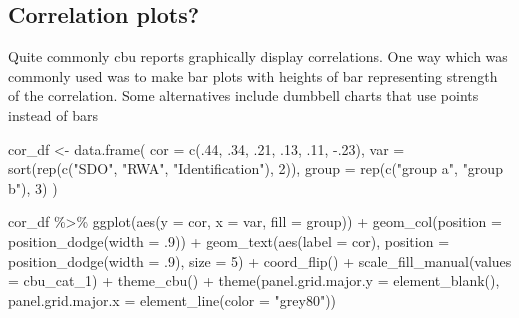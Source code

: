 \documentclass[
  letterpaper,
  DIV=11,
  numbers=noendperiod]{scrreprt}
\newenvironment{Shaded}{\begin{snugshade}}{\end{snugshade}}
\newcommand{\AttributeTok}[1]{\textcolor[rgb]{0.40,0.45,0.13}{#1}}
\newcommand{\DecValTok}[1]{\textcolor[rgb]{0.68,0.00,0.00}{#1}}
\newcommand{\FunctionTok}[1]{\textcolor[rgb]{0.28,0.35,0.67}{#1}}
\newcommand{\NormalTok}[1]{\textcolor[rgb]{0.00,0.23,0.31}{#1}}
\newcommand{\OtherTok}[1]{\textcolor[rgb]{0.00,0.23,0.31}{#1}}
\newcommand{\SpecialCharTok}[1]{\textcolor[rgb]{0.37,0.37,0.37}{#1}}
\newcommand{\StringTok}[1]{\textcolor[rgb]{0.13,0.47,0.30}{#1}}
\begin{document}
\subsection{Correlation plots?}\label{correlation-plots}

Quite commonly cbu reports graphically display correlations. One way
which was commonly used was to make bar plots with heights of bar
representing strength of the correlation. Some alternatives include
dumbbell charts that use points instead of bars

\begin{Shaded}
\begin{Highlighting}[]
\NormalTok{cor\_df }\OtherTok{\textless{}{-}} \FunctionTok{data.frame}\NormalTok{(}
    \AttributeTok{cor =} \FunctionTok{c}\NormalTok{(.}\DecValTok{44}\NormalTok{, .}\DecValTok{34}\NormalTok{, .}\DecValTok{21}\NormalTok{, .}\DecValTok{13}\NormalTok{, .}\DecValTok{11}\NormalTok{, }\SpecialCharTok{{-}}\NormalTok{.}\DecValTok{23}\NormalTok{),}
    \AttributeTok{var =} \FunctionTok{sort}\NormalTok{(}\FunctionTok{rep}\NormalTok{(}\FunctionTok{c}\NormalTok{(}\StringTok{"SDO"}\NormalTok{, }\StringTok{"RWA"}\NormalTok{, }\StringTok{"Identification"}\NormalTok{), }\DecValTok{2}\NormalTok{)),}
    \AttributeTok{group =} \FunctionTok{rep}\NormalTok{(}\FunctionTok{c}\NormalTok{(}\StringTok{"group a"}\NormalTok{, }\StringTok{"group b"}\NormalTok{), }\DecValTok{3}\NormalTok{)}
\NormalTok{)}

\NormalTok{cor\_df }\SpecialCharTok{\%\textgreater{}\%}
\FunctionTok{ggplot}\NormalTok{(}\FunctionTok{aes}\NormalTok{(}\AttributeTok{y =}\NormalTok{ cor, }\AttributeTok{x =}\NormalTok{ var, }\AttributeTok{fill =}\NormalTok{ group)) }\SpecialCharTok{+}
\FunctionTok{geom\_col}\NormalTok{(}\AttributeTok{position =} \FunctionTok{position\_dodge}\NormalTok{(}\AttributeTok{width =}\NormalTok{ .}\DecValTok{9}\NormalTok{)) }\SpecialCharTok{+}
\FunctionTok{geom\_text}\NormalTok{(}\FunctionTok{aes}\NormalTok{(}\AttributeTok{label =}\NormalTok{ cor), }\AttributeTok{position =} \FunctionTok{position\_dodge}\NormalTok{(}\AttributeTok{width =}\NormalTok{ .}\DecValTok{9}\NormalTok{), }\AttributeTok{size =} \DecValTok{5}\NormalTok{) }\SpecialCharTok{+}
\FunctionTok{coord\_flip}\NormalTok{() }\SpecialCharTok{+}
\FunctionTok{scale\_fill\_manual}\NormalTok{(}\AttributeTok{values =}\NormalTok{ cbu\_cat\_1) }\SpecialCharTok{+}
\FunctionTok{theme\_cbu}\NormalTok{() }\SpecialCharTok{+}
\FunctionTok{theme}\NormalTok{(}\AttributeTok{panel.grid.major.y =} \FunctionTok{element\_blank}\NormalTok{(),}
     \AttributeTok{panel.grid.major.x =} \FunctionTok{element\_line}\NormalTok{(}\AttributeTok{color =} \StringTok{"grey80"}\NormalTok{))}
\end{Highlighting}
\end{Shaded}
\end{document}

